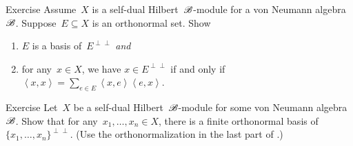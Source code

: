 \begin{parsec}
\begin{point}{Exercise}%
Assume~$X$ is a self-dual Hilbert~$\mathscr{B}$-module for a von Neumann
    algebra~$\mathscr{B}$.
Suppose~$E \subseteq X$ is an orthonormal set. Show
\begin{enumerate}
\item
    $E$ is a basis of~$E^{\perp\perp}$ \emph{and}
\item
    for any~$x \in X$,
        we have
    $x \in E^{\perp\perp}$
    if and only if~$\left<x,x\right> = \sum_{e \in E} \left<x,e\right>
                \left<e,x\right>$.
\end{enumerate}

\end{point}
\begin{point}{Exercise}%
Let~$X$ be a self-dual Hilbert~$\mathscr{B}$-module for some von Neumann
    algebra~$\mathscr{B}$.
Show that for any~$x_1, \ldots, x_n \in X$,
    there is a finite orthonormal basis
    of~$\{x_1, \ldots, x_n\}^{\perp\perp}$.
(Use the orthonormalization in the last part of .)
\end{point}
\end{parsec}


